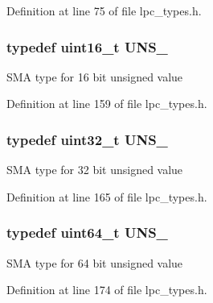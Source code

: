 \-Definition at line 75 of file lpc\-\_\-types.\-h.

\hypertarget{group___l_p_c___types___public___types_gafce87a7f2271b2cf38d7532f157f8a50}{
\subsubsection[{\-U\-N\-S\-\_\-16}]{\setlength{\rightskip}{0pt plus 5cm}typedef uint16\-\_\-t {\bf \-U\-N\-S\-\_}}}\label{group___l_p_c___types___public___types_gafce87a7f2271b2cf38d7532f157f8a50}
\-S\-M\-A type for 16 bit unsigned value 

\-Definition at line 159 of file lpc\-\_\-types.\-h.

\hypertarget{group___l_p_c___types___public___types_ga28adf5c6b1811ca447826319598d8aba}{
\subsubsection[{\-U\-N\-S\-\_\-32}]{\setlength{\rightskip}{0pt plus 5cm}typedef uint32\-\_\-t {\bf \-U\-N\-S\-\_}}}\label{group___l_p_c___types___public___types_ga28adf5c6b1811ca447826319598d8aba}
\-S\-M\-A type for 32 bit unsigned value 

\-Definition at line 165 of file lpc\-\_\-types.\-h.

\hypertarget{group___l_p_c___types___public___types_ga2299199b92f0535ad8c2e2d8c7c7f09b}{
\subsubsection[{\-U\-N\-S\-\_\-64}]{\setlength{\rightskip}{0pt plus 5cm}typedef uint64\-\_\-t {\bf \-U\-N\-S\-\_}}}\label{group___l_p_c___types___public___types_ga2299199b92f0535ad8c2e2d8c7c7f09b}
\-S\-M\-A type for 64 bit unsigned value 

\-Definition at line 174 of file lpc\-\_\-types.\-h.

